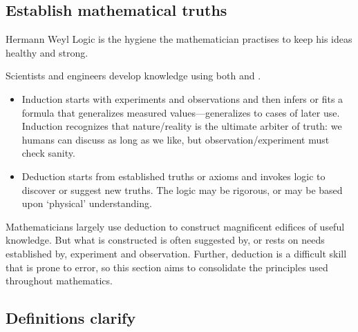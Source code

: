\begin{draft}

\section{Establish mathematical truths}
\label{sec:emt}
\secttoc

\begin{comment}
Perhaps do not include in a first version:  needs to be written.
Beezer2015 has a relevant presentation in Proof Techniques, and also sets, in an end-chapter called Preliminaries.
\end{comment}

\begin{quoted}{Hermann Weyl}
Logic is the hygiene the mathematician practises to keep his ideas healthy and strong.
\end{quoted}

Scientists and engineers develop knowledge using both  and .
\begin{itemize}
\item Induction starts with experiments and observations and then infers or fits a formula that generalizes measured values---generalizes to cases of later use.  
Induction recognizes that nature\slash reality is the ultimate arbiter of truth: we humans can discuss as long as we like, but observation\slash experiment must check sanity.

\item Deduction starts from established truths or axioms and invokes logic to discover or suggest new truths.
The logic may be rigorous, or may be based upon `physical' understanding.

\end{itemize}
Mathematicians largely use deduction to construct magnificent edifices of useful knowledge.
But what is constructed is often suggested by, or rests on needs established by, experiment and observation.
Further, deduction is a difficult skill that is prone to error, so this section aims to consolidate the principles used throughout mathematics.


\begin{comment}
experimental mathematics somewhere.
\end{comment}


\subsection{Definitions clarify}
\label{sec:dc}




\end{draft}
